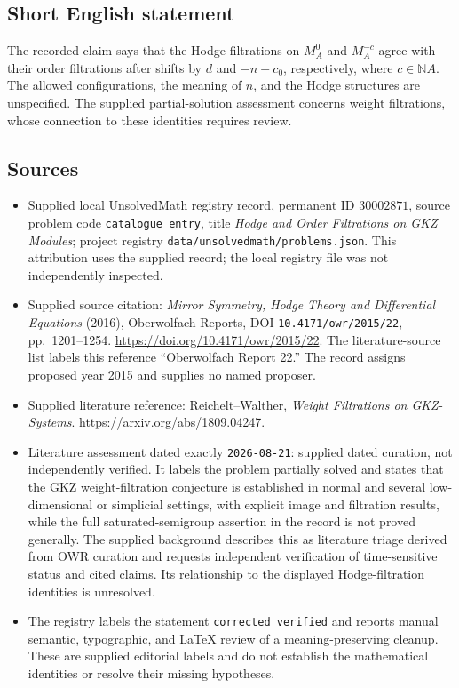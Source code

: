 \documentclass[11pt]{article}
\newcommand{\N}{\mathbb{N}}
\begin{document}
\subsection{Short English statement}
The recorded claim says that the Hodge filtrations on \(M_A^0\) and \(M_A^{-c}\) agree with their order filtrations after shifts by \(d\) and \(-n-c_0\), respectively, where \(c\in\N A\). The allowed configurations, the meaning of \(n\), and the Hodge structures are unspecified. The supplied partial-solution assessment concerns weight filtrations, whose connection to these identities requires review.
\subsection{Sources}
\begin{itemize}
\item Supplied local UnsolvedMath registry record, permanent ID \(30002871\), source problem code \texttt{catalogue entry}, title \emph{Hodge and Order Filtrations on GKZ Modules}; project registry \texttt{data/unsolvedmath/problems.json}. This attribution uses the supplied record; the local registry file was not independently inspected.
\item Supplied source citation: \emph{Mirror Symmetry, Hodge Theory and Differential Equations} (2016), Oberwolfach Reports, DOI \texttt{10.4171/owr/2015/22}, pp.~1201--1254. \url{https://doi.org/10.4171/owr/2015/22}. The literature-source list labels this reference ``Oberwolfach Report 22.'' The record assigns proposed year 2015 and supplies no named proposer.
\item Supplied literature reference: Reichelt--Walther, \emph{Weight Filtrations on GKZ-Systems}. \url{https://arxiv.org/abs/1809.04247}.
\item Literature assessment dated exactly \texttt{2026-08-21}: supplied dated curation, not independently verified. It labels the problem partially solved and states that the GKZ weight-filtration conjecture is established in normal and several low-dimensional or simplicial settings, with explicit image and filtration results, while the full saturated-semigroup assertion in the record is not proved generally. The supplied background describes this as literature triage derived from OWR curation and requests independent verification of time-sensitive status and cited claims. Its relationship to the displayed Hodge-filtration identities is unresolved.
\item The registry labels the statement \texttt{corrected\_verified} and reports manual semantic, typographic, and LaTeX review of a meaning-preserving cleanup. These are supplied editorial labels and do not establish the mathematical identities or resolve their missing hypotheses.
\end{itemize}
\end{document}
